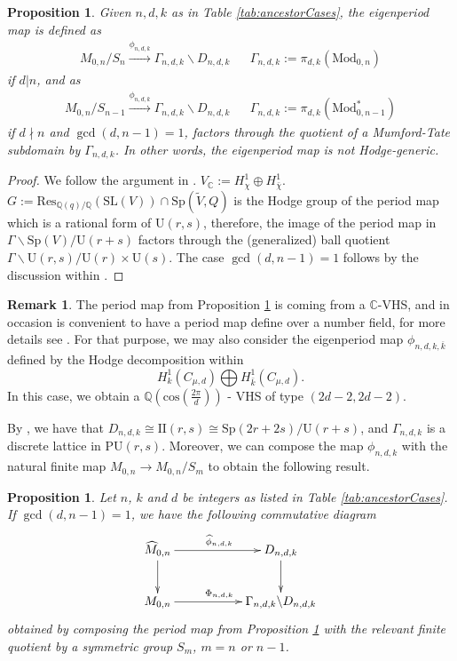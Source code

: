 \documentclass[12pt, letterpaper]{amsart}
\theoremstyle{plain}
\newtheorem{proposition}[theorem]{Proposition}
\theoremstyle{definition}
\newtheorem{remark}[theorem]{Remark}
\begin{document}
\begin{proposition}
\label{prop:eigenperiod}
Given $n,d,k$ as in Table \ref{tab:ancestorCases}, 
the eigenperiod map is defined as
\begin{align*}
M_{0,n}/S_n \xrightarrow{\phi_{n,d,k}}  
\Gamma_{n,d,k} \backslash D_{n,d,k}    
&&
\Gamma_{n,d,k}:= \pi_{d,k}(\mathrm{Mod}_{0,n})
\end{align*}
if $d|n$, and as
\begin{align*}
M_{0,n}/S_{n-1} \xrightarrow{\phi_{n,d,k}}  
\Gamma_{n,d,k}^{} \backslash D_{n,d,k}   
&& 
\Gamma_{n,d,k}^{}:= \pi_{d,k}(\mathrm{Mod}^*_{0,n-1})
\end{align*}
if $d\nmid n$ and $\gcd(d,n-1)=1$, factors through the quotient of a Mumford-Tate subdomain by $\Gamma_{n,d,k}$. In other words, the eigenperiod map is not Hodge-generic. 
\end{proposition}
\begin{proof}
We follow the argument in \cite[Sec 3.1]{gallardo2021geometric}.
$V_{\mathbb{C}}:= H^1_{\chi}\oplus H^1_{\bar{\chi}}$.
$G:=\mathrm{Res}_{\mathbb{Q}(q)/\mathbb{Q}}(\mathrm{SL}(V))\cap \mathrm{Sp}(\tilde{V},Q)$ is the Hodge group of the period map which is a rational form of $\mathrm{U}(r,s)$, therefore, the image of the period map in $\Gamma \backslash \mathrm{Sp}(V)/\mathrm{U}(r+s)$ factors through the (generalized) ball quotient
$\Gamma \backslash \mathrm{U}(r,s)/ \mathrm{U}(r)\times \mathrm{U}(s)$. The case $\gcd(d,n-1)=1$ follows by the discussion within
\cite[Sec 2]{McM13}.
\end{proof}
\begin{remark}
The period map from Proposition 
\ref{prop:eigenperiod} is coming from a $\mathbb{C}$-VHS, and in occasion is convenient to have a period map define over a number field, for more details see \cite[Sec 7]{dolgachev2007moduli}.
 For that purpose,  we may also consider the eigenperiod map 
$\phi_{n,d,k,\overline{k}}$
defined by the Hodge decomposition within
$$
H^1_{k}(C_{\mu,d})\bigoplus H^1_{\bar{k}}(C_{\mu,d}).
$$
In this case, we obtain a $\mathbb{Q}(\mathrm{cos}(\frac{2\pi}{d}))$ - VHS of type $(2d-2,2d-2)$.    \end{remark}

By \cite[(2.5)]{McM13}, we have that
$D_{n,d,k} \cong \text{II}(r,s)\cong \mathrm{Sp}(2r+2s)/\mathrm{U}(r+s)$, and $\Gamma_{n,d,k}$ is  a discrete lattice in $\mathrm{PU}(r,s)$. Moreover, we can compose the map $\phi_{n,d,k}$ with the natural finite map $M_{0,n} \to M_{0,n}/S_m$ to obtain the following result. 
\begin{proposition}
\label{prop:EigenPeriodM0n}
Let $n$, $k$ and $d$ be integers as listed in Table \ref{tab:ancestorCases}.
If $\gcd(d, n-1) = 1$, we have the following commutative diagram
\begin{align*}
\xymatrix{
\widehat{M}_{0,n} \ar[d] \ar[rr]
^{\widehat{\phi}_{n,d,k}}
&& D_{n,d,k}
\ar[d]
\\
M_{0,n} \ar[rr]^{\Phi_{n,d,k}} && 
\Gamma_{n,d,k}\backslash D_{n,d,k}
}
\end{align*}
obtained by composing the period map from Proposition \ref{prop:eigenperiod} with the relevant finite quotient by a symmetric group $S_m$, $m=n$ or $n-1$.
\end{proposition}
\end{document}
